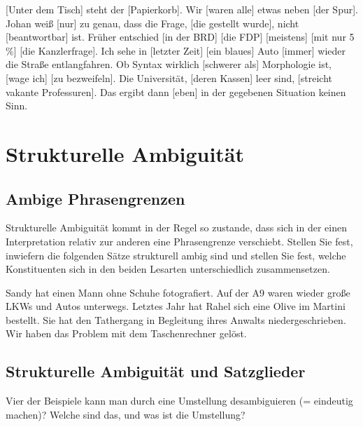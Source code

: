 \documentclass[12pt,a4paper,twoside]{article}
\begin{document}
\begin{exe}
  \ex{} [Unter dem Tisch] steht der [Papierkorb].
  \ex{} Wir [waren alle] etwas neben [der Spur].
  \ex{} Johan weiß [nur] zu genau, dass die Frage, [die gestellt wurde], nicht [beantwortbar] ist.
  \ex{} Früher entschied [in der BRD] [die FDP] [meistens] [mit nur 5 \%] [die Kanzlerfrage]. 
  \ex{} Ich sehe in [letzter Zeit] [ein blaues] Auto [immer] wieder die Straße entlangfahren.
  \ex{} Ob Syntax wirklich [schwerer als] Morphologie ist, [wage ich] [zu bezweifeln].
  \ex{} Die Universität, [deren Kassen] leer sind, [streicht vakante Professuren].
  \ex{} Das ergibt dann [eben] in der gegebenen Situation keinen Sinn.
\end{exe}


\section{Strukturelle Ambiguität}

\subsection{Ambige Phrasengrenzen}

Strukturelle Ambiguität kommt in der Regel so zustande, dass sich in der einen Interpretation relativ zur anderen eine Phrasengrenze verschiebt.
Stellen Sie fest, inwiefern die folgenden Sätze strukturell ambig sind und stellen Sie fest, welche Konstituenten sich in den beiden Lesarten unterschiedlich zusammensetzen.

\begin{exe}
  \ex Sandy hat einen Mann ohne Schuhe fotografiert.
  \ex Auf der A9 waren wieder große LKWs und Autos unterwegs.
  \ex Letztes Jahr hat Rahel sich eine Olive im Martini bestellt.
  \ex Sie hat den Tathergang in Begleitung ihres Anwalts niedergeschrieben.
  \ex Wir haben das Problem mit dem Taschenrechner gelöst.
\end{exe}

\subsection{Strukturelle Ambiguität und Satzglieder}

Vier der Beispiele kann man durch eine Umstellung desambiguieren (= eindeutig machen)?
Welche sind das, und was ist die Umstellung?
\end{document}
